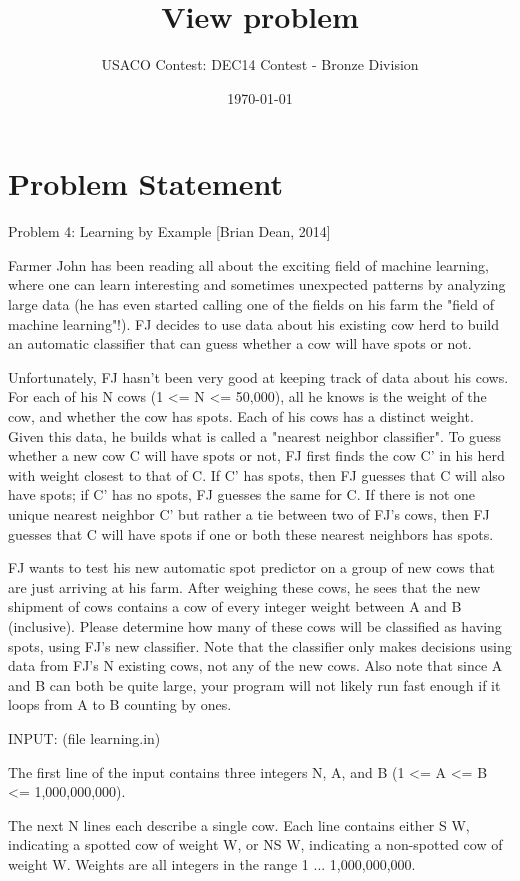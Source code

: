 \documentclass[12pt]{article}
\title{View problem}
\author{USACO Contest: DEC14 Contest - Bronze Division}
\date{\today}
\begin{document}
\maketitle

\section*{Problem Statement}

Problem 4: Learning by Example [Brian Dean, 2014]

Farmer John has been reading all about the exciting field of machine
learning, where one can learn interesting and sometimes unexpected
patterns by analyzing large data (he has even started calling one of
the fields on his farm the "field of machine learning"!).  FJ decides
to use data about his existing cow herd to build an automatic
classifier that can guess whether a cow will have spots or not.

Unfortunately, FJ hasn't been very good at keeping track of data about
his cows.  For each of his N cows (1 <= N <= 50,000), all he knows is
the weight of the cow, and whether the cow has spots.  Each of his
cows has a distinct weight.  Given this data, he builds what is called
a "nearest neighbor classifier".  To guess whether a new cow C will
have spots or not, FJ first finds the cow C' in his herd with weight
closest to that of C.  If C' has spots, then FJ guesses that C will
also have spots; if C' has no spots, FJ guesses the same for C.  If
there is not one unique nearest neighbor C' but rather a tie between
two of FJ's cows, then FJ guesses that C will have spots if one or
both these nearest neighbors has spots.

FJ wants to test his new automatic spot predictor on a group of new
cows that are just arriving at his farm.  After weighing these cows,
he sees that the new shipment of cows contains a cow of every integer
weight between A and B (inclusive).  Please determine how many of
these cows will be classified as having spots, using FJ's new
classifier.  Note that the classifier only makes decisions using data
from FJ's N existing cows, not any of the new cows.  Also note that
since A and B can both be quite large, your program will not likely
run fast enough if it loops from A to B counting by ones.

INPUT: (file learning.in) 

The first line of the input contains three integers N, A, and B
(1 <= A <= B <= 1,000,000,000).

The next N lines each describe a single cow.  Each line contains
either S W, indicating a spotted cow of weight W, or NS W, indicating
a non-spotted cow of weight W.  Weights are all integers in the range
1 ... 1,000,000,000. 
\end{document}
